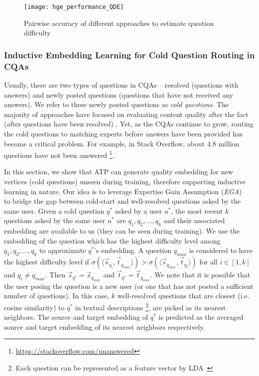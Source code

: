 \documentclass[letterpaper]{article} \usepackage{aaai19}  \usepackage{times}  \usepackage{helvet}  \usepackage{courier}  \usepackage{url}  \usepackage{graphicx}  \usepackage{booktabs} \usepackage{xcolor}
\begin{document}
\begin{figure}[t!]
    \centering
    \small
    \texttt{[image: hge\_performance\_QDE]}
    \caption{Pairwise accuracy  of different approaches to estimate question difficulty} 
    \label{fig:hge_performance_qde}
\end{figure}


\subsubsection{Inductive Embedding Learning for Cold Question Routing in CQAs}

Usually, there are two types of questions in CQAs -- resolved (questions with answers) and newly posted questions (questions that have not received any answers). We refer to these newly posted questions as {\em cold questions}. The majority of approaches have focused on evaluating content quality after the fact (after questions have been resolved) \cite{Yang2013CQArank}. Yet, as the CQAs continue to grow, routing the cold questions to matching experts before answers have been provided has become a critical problem. For example, in Stack Overflow, about 4.8 million questions have not been answered \footnote{\url{https://stackoverflow.com/unanswered}}.

In this section, we show that ATP can generate quality embedding for new vertices (cold questions) unseen during training, therefore supporting inductive learning in nature. Our idea is to leverage Expertise Gain Assumption ({\em EGA}) ~\cite{QDEE2018} to bridge the gap between cold-start and well-resolved questions asked by the same user. Given a cold question $q^*$ asked by a user $u^*$, the most recent $k$ questions asked by the same user $u^*$ are $q_1,q_2,...,q_k$ and their associated embedding are available to us (they can be seen during training). We use the embedding of the question which has the highest difficulty level among $q_1,q_2,...,q_k$ to approximate $q^*$'s embedding. A question $q_{max}$ is considered to have the highest difficulty level if $\sigma (\langle \vec{s}_{q_i} , \vec{t}_{q_{max}} \rangle) > \sigma (\langle \vec{s}_{q_{max}},\vec{t}_{q_{i}} \rangle)$ for all $i \in [1,k]$ and $q_i \neq q_{max}$. Then $\vec{s}_{q^*} = \vec{s}_{q_{max}}$ and  $\vec{t}_{q^*} = \vec{t}_{q_{max}}$. We note that it is possible that the user posing the question is a new user (or one that has not posted a sufficient number of questions). In this case, $k$ well-resolved questions that are closest (i.e. cosine similarity) to $q^*$ in textual descriptions \footnote{Each question can be represented as a feature vector by LDA~\cite{Ji2012LDA}}, are picked as its nearest neighbors. The source and target embedding of $q^*$ is predicted as the averaged source and target embedding of its nearest neighbors respectively. 
\end{document}
